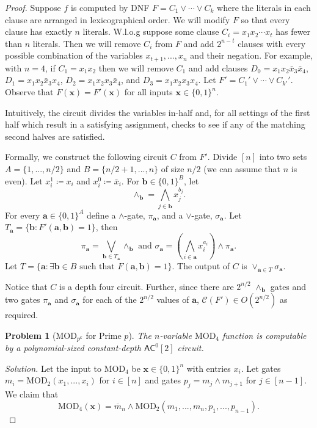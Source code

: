 \documentclass[11pt]{article}
\newcommand\circuitsize{\mathcal{C}}
\newcommand\class[1]{\mathsf{#1}}
\newcommand\ff[1]{\mathrm{#1}}
\newcommand\vv[1]{\mathbf{#1}}
\newtheorem{problem}{Problem}
\begin{document}
\begin{proof}
Suppose $f$ is computed by DNF $F = C_1 \lor \cdots \lor C_k$ where the literals in each clause are arranged in lexicographical order. We will modify $F$ so that every clause has exactly $n$ literals. W.l.o.g suppose some clause $C_i = x_1 x_2 \cdots x_{t}$ has fewer than $n$ literals. Then we will remove $C_i$ from $F$ and add $2^{n-t}$ clauses with every possible combination of the variables $x_{t+1}, ..., x_{n}$ and their negation. For example, with $n = 4$, if $C_1 = x_1x_2$ then we will remove $C_1$ and add clauses $D_0 = x_1x_2\bar{x}_3\bar{x}_4$, $D_1 = x_1x_2\bar{x}_3x_4$, $D_2 = x_1x_2x_3\bar{x}_4$, and $D_3 = x_1x_2x_3x_4$. Let $F' = C_1' \lor \cdots \lor C_{k'}'$. Observe that $F(\vv{x}) = F'(\vv{x})$ for all inputs $\vv{x} \in \{0,1\}^n$.

Intuitively, the circuit divides the variables in-half and, for all settings of the first half which result in a satisfying assignment, checks to see if any of the matching second halves are satisfied.

Formally, we construct the following circuit $C$ from $F'$. Divide $[n]$ into two sets $A = \{1,..., n/2\}$ and $B = \{n/2 + 1, ..., n\}$ of size $n/2$ (we can assume that $n$ is even). Let $x_i^{1} \coloneqq x_i$ and $x_i^{0} \coloneqq \bar{x}_i$. For $\vv{b} \in \{0,1\}^B$, let 
\[\land_{\vv{b}} = \bigwedge_{j \in \vv{b}} x_{j}^{b_{j}}.\] 
For every $\vv{a} \in \{0,1\}^A$ define a $\land$-gate, $\pi_{\vv{a}}$, and a $\lor$-gate, $\sigma_{\vv{a}}$. Let $T_{\vv{a}} =  \{\vv{b}: F'(\vv{a}, \vv{b}) = 1\}$, then 
\[\pi_{\vv{a}} = \bigvee_{\vv{b} \in T_{\vv{a}}} \land_{\vv{b}} \mbox{ and } \sigma_{\vv{a}} = \left(\bigwedge_{i \in \vv{a}} x_i^{a_i}\right) \land \pi_{\vv{a}}.\]
Let $T = \{\vv{a}: \exists \vv{b} \in B \mbox{ such that } F(\vv{a}, \vv{b}) = 1\}$. The output of $C$ is $\lor_{\vv{a} \in T} \sigma_{\vv{a}}$.

Notice that $C$ is a depth four circuit. Further, since there are $2^{n/2}$ $\land_{\vv{b}}$ gates and two gates $\pi_{\vv{a}}$ and $\sigma_{\vv{a}}$ for each of the $2^{n/2}$ values of $\vv{a}$, $\circuitsize(F') \in O(2^{n/2})$ as required.   
\vspace{1em}
\begin{problem}[$\ff{MOD}_{p^k}$ for Prime $p$]
	The $n$-variable $\ff{MOD}_4$ function is computable by a polynomial-sized constant-depth $\class{AC}^0[2]$ circuit.
\end{problem}
\emph{Solution.}
Let the input to $\ff{MOD}_4$ be $\vv{x} \in \{0,1\}^n$ with entries $x_i$. Let gates $m_i = \ff{MOD}_2(x_1, ..., x_i)$ for $i \in [n]$ and gates $p_j = m_j \land m_{j+1}$ for $j \in [n-1]$. We claim that
\[\ff{MOD}_4(\vv{x}) = \overline{m}_n \land \ff{MOD}_2(m_1, ..., m_n, p_1, ..., p_{n-1}).\] 


\end{proof}
\end{document}
